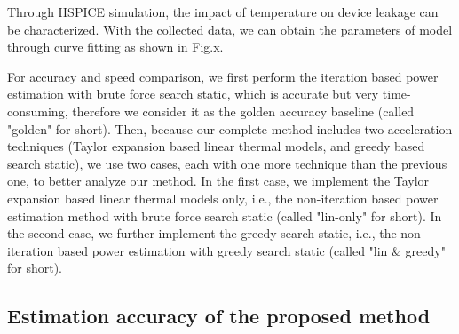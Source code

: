 Through HSPICE simulation, the impact of temperature on device leakage can be characterized. With the collected data, we can obtain the parameters of model through curve fitting as shown in Fig.x.

For accuracy and speed comparison, we first perform the iteration based power estimation with brute force search static, which is accurate but very time-consuming, therefore we consider it as the golden accuracy baseline (called "golden" for short). Then, because our complete method includes two acceleration techniques (Taylor expansion based linear thermal models, and greedy based search static), we use two cases, each with one more technique than the previous one, to better analyze our method. In the first case, we implement the Taylor expansion based linear thermal models only, i.e., the non-iteration based power estimation method with brute force search static (called "lin-only" for short). In the second case, we further implement the greedy search static, i.e., the non-iteration based power estimation with greedy search static (called "lin & greedy" for short).

\subsection{Estimation accuracy of the proposed method}
